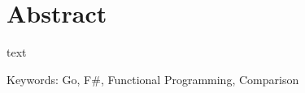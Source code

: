 \chapter*{Abstract}
\thispagestyle{empty}
text

\bigskip

\noindent
Keywords: Go, F\#, Functional Programming, Comparison

